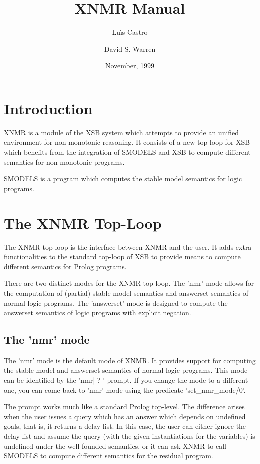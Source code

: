 \documentclass{article}
\title{XNMR Manual}
\author{Lu\'\i s Castro \and David S. Warren}
\date{November, 1999}
\begin{document}
\maketitle
\section{Introduction}

XNMR is a module of the XSB system which attempts to provide an
unified environment for non-monotonic reasoning. It consists of a new
top-loop for XSB which benefits from the integration of SMODELS and
XSB to compute different semantics for non-monotonic programs.

SMODELS is a program which computes the stable model semantics for
logic programs. 

\section{The XNMR Top-Loop}

The XNMR top-loop is the interface between XNMR and the user. It adds
extra functionalities to the standard top-loop of XSB to provide means
to compute different semantics  for Prolog programs.

There are two distinct modes for the XNMR top-loop. The 'nmr' mode
allows for the computation of (partial) stable model semantics and
answerset semantics of normal logic programs. The 'answerset' mode is
designed to compute the answerset semantics of logic programs with
explicit negation.

\subsection{The 'nmr' mode}

The 'nmr' mode is the default mode of XNMR. It provides support for
computing the stable model and answerset semantics of normal logic
programs. This mode can be identified by the 'nmr| ?-' prompt. If you
change the mode to a different one, you can come back to 'nmr' mode
using the predicate 'set_nmr_mode/0'.

The prompt works much like a standard Prolog top-level. The difference
arises when the user issues a query which has an answer which depends
on undefined goals, that is, it returns a delay list. In this case,
the user can either ignore the delay list and assume the query (with
the given instantiations for the variables) is undefined under the
well-founded semantics, or it can ask XNMR to call SMODELS to compute
different semantics for the residual program.
\end{document}
